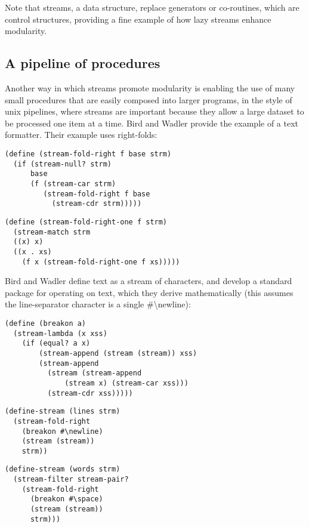 Note that streams, a data structure, replace generators or co-routines,
which are control structures, providing a fine example of how lazy
streams enhance modularity.

\subsection{A pipeline of procedures}\label{a-pipeline-of-procedures}

Another way in which streams promote modularity is enabling the use of
many small procedures that are easily composed into larger programs, in
the style of unix pipelines, where streams are important because they
allow a large dataset to be processed one item at a time. Bird and
Wadler provide the example of a text formatter. Their example uses
right-folds:

\begin{verbatim}
(define (stream-fold-right f base strm) 
  (if (stream-null? strm)
      base
      (f (stream-car strm)
         (stream-fold-right f base
           (stream-cdr strm)))))
\end{verbatim}

\begin{verbatim}
(define (stream-fold-right-one f strm)
  (stream-match strm
  ((x) x)
  ((x . xs)
    (f x (stream-fold-right-one f xs)))))
\end{verbatim}

Bird and Wadler define text as a stream of characters, and develop a
standard package for operating on text, which they derive mathematically
(this assumes the line-separator character is a single
\#\textbackslash{}newline):

\begin{verbatim}
(define (breakon a)
  (stream-lambda (x xss)
    (if (equal? a x)
        (stream-append (stream (stream)) xss)
        (stream-append
          (stream (stream-append
              (stream x) (stream-car xss)))
          (stream-cdr xss)))))
\end{verbatim}

\begin{verbatim}
(define-stream (lines strm) 
  (stream-fold-right
    (breakon #\newline)
    (stream (stream))
    strm))
\end{verbatim}

\begin{verbatim}
(define-stream (words strm)
  (stream-filter stream-pair?
    (stream-fold-right
      (breakon #\space)
      (stream (stream))
      strm)))
\end{verbatim}

